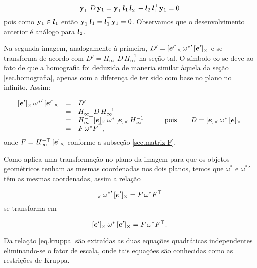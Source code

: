 \begin{equation*}
{\bf y}_1^\top\,D\,{\bf y}_1={\bf y}_1^\top \boldsymbol{l}_1\,\boldsymbol{l}_2^\top + \boldsymbol{l}_2\,\boldsymbol{l}_1^\top{\bf y}_1=0
\end{equation*}
pois como ${\bf y}_1\in\boldsymbol{l}_1$ então ${\bf y}_1^\top \boldsymbol{l}_1=\boldsymbol{l}_1^\top{\bf y}_1=0$. Observamos que o desenvolvimento anterior é análogo para $\boldsymbol{l}_2$.

Na segunda imagem, analogamente à primeira, $D'=[\boldsymbol{e}']_\times\,{{\bf \omega}^*}'\,[\boldsymbol{e}']_\times$ e se transforma de acordo com $D'=H_\infty^{-\top}D\,H_\infty^{-1}$ na seção tal. O símbolo $\infty$ se deve ao fato de que a homografia foi deduzida de maneria similar àquela da seção  \ref{sec.homografia}, apenas com a diferença de ter sido com base no plano no infinito. Assim:

\begin{equation}
\begin{array}{rcll}
[\boldsymbol{e}']_\times\,{{\bf \omega}^*}'\,[\boldsymbol{e}']_\times&=&D'&\\
&=&H_\infty^{-\top}D\,H_\infty^{-1}&\\
&=&H_\infty^{-\top}[\boldsymbol{e}]_\times\,{\bf \omega}^*\,[\boldsymbol{e}]_\times\,H_\infty^{-1}&\qquad\text{pois}\qquad D=[\boldsymbol{e}]_\times\,{\bf \omega}^*\,[\boldsymbol{e}]_\times\\
&=&F\,\omega^* F^\top,&
\end{array}
\end{equation}
onde $F=H_\infty^{-\top}\,[\boldsymbol{e}]_\times$ conforme a subseção \ref{sec.matriz-F}. 


Como \cite{2503343} aplica uma transformação no plano da imagem para que os objetos geométricos tenham as mesmas coordenadas nos dois planos, temos que $\omega^*$ e ${\omega^*}'$ têm as mesmas coordenadas, assim a relação

\begin{equation*}
[\e']_\times\,{{\bf \omega}^*}'\,[\e']_\times=F\,\omega^* F^\top
\end{equation*}
se transforma em 

\begin{equation}\label{eq.kruppa}
[\boldsymbol{e}']_\times\,{\bf \omega}^*\,[\boldsymbol{e}']_\times=F\,\omega^* F^\top.
\end{equation}



Da relação \ref{eq.kruppa} são extraídas as duas equações quadráticas independentes eliminando-se o fator de escala, onde tais equações são conhecidas como as restrições de Kruppa. 




